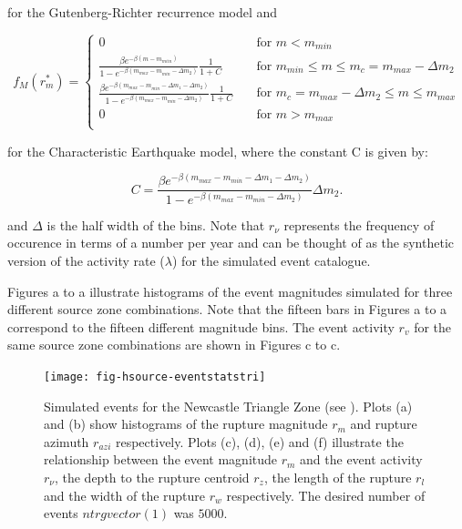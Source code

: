 \begin{enumerate}
for the Gutenberg-Richter recurrence model \citep{dr_Kramer96a} and 

\begin{equation} \label{eq:pdf_ch}
f_M(r_m^*) = \left\{
\begin{array}{ll}
0 & \quad \mbox{for $m < m_{min}$} \\
\frac{\beta e ^{- \beta (m-m_{miin})}}{1-e^{-\beta (m_{max} - m_{min} - \Delta m_{2})}} \frac{1}{1+C}& \quad \mbox{for $m_{min} \leq m \leq m_{c} = m_{max} - \Delta m_{2}$} \\
\frac{\beta e ^{- \beta (m_{max}-m_{min}-\Delta m_{1} - \Delta m_{2})}}{1-e^{-\beta (m_{max} - m_{min} - \Delta m_{2})}}  \frac{1}{1+C}& \quad \mbox{for $m_{c} = m_{max} - \Delta m_{2} \leq m \leq m_{max}$} \\
0 & \quad \mbox{for $m > m_{max}$} \\ 
\end{array}
 \right. 
\end{equation}

for the Characteristic Earthquake model\citep{eqrm_Schwartz84}, where the constant C is given by:

\begin{equation}
C = \frac{\beta e ^{- \beta (m_{max}-m_{min}-\Delta m_{1} - \Delta m_{2})}}  {1-e^{-\beta (m_{max} - m_{min} - \Delta m_{2})}}  \Delta m_{2} .
\end{equation}


\citep{dr_Kramer96a} and $\Delta$ is the half width of the bins.
Note that $r_\nu$ represents the frequency of occurence in terms
of a number per year and can be thought of as the synthetic
version of the activity rate ($\lambda$) for the simulated event catalogue.
\end{enumerate}



Figures a to a
illustrate histograms of the event magnitudes simulated for three
different source zone combinations. Note that the fifteen bars in
Figures a to a
correspond to the fifteen different magnitude bins. The event
activity $r_v$ for the same source zone combinations are shown in
Figures c to c.

\begin{figure}
  \vspace{0.8em}
\begin{center}
\texttt{[image: fig-hsource-eventstatstri]}
\end{center}
\caption{Simulated events for the Newcastle Triangle Zone (see
\citealt{dr_Dhu02b}). Plots (a) and (b) show histograms of the
rupture magnitude $r_m$ and rupture azimuth $r_{azi}$
respectively. Plots (c), (d), (e) and (f) illustrate the
relationship between the event magnitude $r_m$ and the event
activity $r_\nu$, the depth to the rupture centroid $r_z$, the
length of the rupture $r_l$ and the width of the rupture $r_w$
respectively. The desired number of events $ntrgvector(1)$ was
$5000$.} \label{fig:source-catalogue-results1}
\end{figure}

